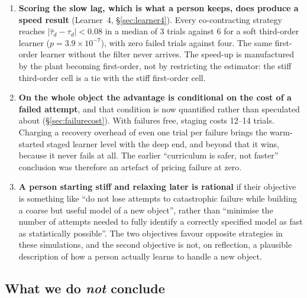 \documentclass[11pt,a4paper]{article}
\begin{document}
\begin{enumerate}
\item \textbf{Scoring the slow lag, which is what a person keeps, does
  produce a speed result} (Learner~4, \S\ref{sec:learner4}). Every
  co-contracting strategy reaches $|\hat\tau_d-\tau_d|<0.08$ in a median of
  3 trials against 6 for a soft third-order learner
  ($p=3.9\times10^{-7}$), with zero failed trials against four. The same
  first-order learner without the filter never arrives. The speed-up is
  manufactured by the plant becoming first-order, not by restricting the
  estimator: the stiff third-order cell is a tie with the stiff first-order
  cell.

\item \textbf{On the whole object the advantage is conditional on the cost
  of a failed attempt}, and that condition is now quantified rather than
  speculated about (\S\ref{sec:failurecost}). With failures free, staging
  costs 12--14 trials. Charging a recovery overhead of even one trial per
  failure brings the warm-started staged learner level with the deep end,
  and beyond that it wins, because it never fails at all. The earlier
  ``curriculum is safer, not faster'' conclusion was therefore an artefact
  of pricing failure at zero.

\item \textbf{A person starting stiff and relaxing later is rational} if their
  objective is something like ``do not lose attempts to catastrophic failure
  while building a coarse but useful model of a new object'', rather than
  ``minimise the number of attempts needed to fully identify a correctly
  specified model as fast as statistically possible''. The two objectives
  favour opposite strategies in these simulations, and the second objective
  is not, on reflection, a plausible description of how a person actually
  learns to handle a new object.
\end{enumerate}

\subsection{What we do \emph{not} conclude}
\end{document}
